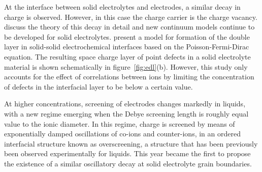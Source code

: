 \documentclass[../main.tex]{subfiles}
\begin{document}
At the interface between solid electrolytes and electrodes, a similar decay in charge is observed. However, in this case the charge carrier is the charge vacancy. \citeauthor{Maier_ProgSolStatChem1995} discuss the theory of this decay in detail \cite{Maier_ProgSolStatChem1995} and new continuum models continue to be developed for solid electrolytes\cite{Mebane_CompMaterSci2015,MebaneAndDeSouza_EnergyEnivronSci2015,TongEtAl_JAmCeramSoc2020,Lund_2021}. \citeauthor{Swift2021} present a model for formation of the double layer in solid-solid electrochemical interfaces based on the Poisson-Fermi-Dirac equation. The resulting space charge layer of point defects in a solid electrolyte material is shown schematically in figure~\ref{fig:edl}(b). However, this study only accounts for the effect of correlations between ions by limiting the concentration of defects in the interfacial layer to be below a certain value.

At higher concentrations, screening of electrodes changes markedly in liquids, with a new regime emerging when the Debye screening length is roughly equal value to the ionic diameter. In this regime, charge is screened by means of exponentially damped oscillations of co-ions and counter-ions, in an ordered interfacial structure known as overscreening\cite{bazant2011double}, a structure that has been previously been observed experimentally for liquids\cite{perkin_ionic_2012, groves2021surface, bowers2004surface, sloutskin2005surface}. This year \citeauthor{dean2021overscreening} became the first to propose the existence of a similar oscillatory decay at solid electrolyte grain boundaries. \cite{dean2021overscreening}
\end{document}
